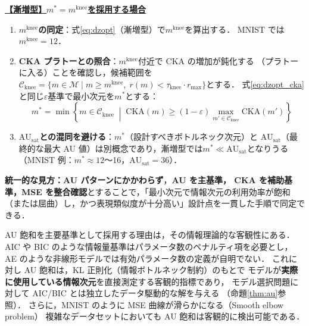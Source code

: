 \documentclass[12pt,a4paper]{jsarticle}
\newcommand{\dzopt}{m^*}                    %
\newcommand{\AUsat}{\mathrm{AU}_{\mathrm{sat}}}
\newcommand{\mknee}{m^{\mathrm{knee}}}      %
\begin{document}
\medskip
\noindent\underline{\textbf{【漸増型】$\dzopt = \mknee$を採用する場合}}
\begin{enumerate}
  \item \textbf{$\mknee$の同定}：式\eqref{eq:dzopt}（漸増型）で$\mknee$を算出する．
        MNIST では$\mknee = 12$．
  \item \textbf{CKA プラトーとの照合}：$\mknee$付近で CKA の増加が鈍化する
        （プラトーに入る）ことを確認し，候補範囲を$\mathcal{C}_{\mathrm{knee}}
        = \{m \in \mathcal{M} \mid m \geq \mknee,\; r(m) < \tau_{\mathrm{knee}} \cdot r_{\max}\}$とする．
        式\eqref{eq:dzopt_cka}と同じ$\varepsilon$基準で最小次元を$\dzopt$とする：
        \begin{equation}
          \dzopt = \min\!\left\{m \in \mathcal{C}_{\mathrm{knee}}
          \;\middle|\;
          \mathrm{CKA}(m) \geq (1-\varepsilon)\max_{m'\in\mathcal{C}_{\mathrm{knee}}}\mathrm{CKA}(m')
          \right\}
          \label{eq:dzopt_cka_knee}
        \end{equation}
  \item \textbf{$\AUsat$との混同を避ける}：$\dzopt$（設計すべきボトルネック次元）と
        $\AUsat$（最終的な最大 AU 値）は別概念であり，漸増型では$\dzopt \ll \AUsat$となりうる
        （MNIST 例：$\dzopt \approx 12$〜16，$\AUsat = 36$）．
\end{enumerate}

\noindent\textbf{統一的な見方：}\textbf{AU パターンにかかわらず}，\textbf{AU を主基準，
CKA を補助基準，MSE を整合確認}とすることで，「最小次元で情報次元の利用効率が飽和
（または屈曲）し，かつ表現類似度が十分高い」設計点を一貫した手順で同定できる．

AU 飽和を主要基準として採用する理由は，その情報理論的な客観性にある．
AIC や BIC のような情報量基準はパラメータ数のペナルティ項を必要とし，
AE のような非線形モデルでは有効パラメータ数の定義が自明でない．
これに対し AU 飽和は，KL 正則化（情報ボトルネック制約）のもとで
モデルが\textbf{実際に使用している情報次元}を直接測定する客観的指標であり，
モデル選択問題に対して AIC/BIC とは独立したデータ駆動的な解を与える
（命題\ref{thm:au}参照）．
さらに，MNIST のように MSE 曲線が滑らかになる（Smooth elbow problem）
複雑なデータセットにおいても AU 飽和は客観的に検出可能である．
\end{document}
